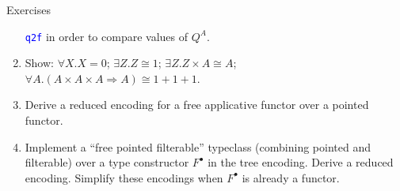 \documentclass[english,,russian]{beamer}
\begin{document}
\begin{frame}{Exercises}
\begin{enumerate}
{}\texttt{\textcolor{blue}{\footnotesize{}q2f}}{\footnotesize{} in
order to compare values of $Q^{A}$.}{\footnotesize\par}
\item {\footnotesize{}Show: $\forall X.X=0$; $\exists Z.Z\cong1$; $\exists Z.Z\times A\cong A$;
$\forall A.\left(A\times A\times A\Rightarrow A\right)\cong1+1+1$.}{\footnotesize\par}
\item {\footnotesize{}Derive a reduced encoding for a free applicative functor
over a pointed functor.}{\footnotesize\par}
\item {\footnotesize{}Implement a ``free pointed filterable'' typeclass
(combining pointed and filterable) over a type constructor $F^{\bullet}$
in the tree encoding. Derive a reduced encoding. Simplify these encodings
when $F^{\bullet}$ is already a functor.}{\footnotesize\par}
\end{enumerate}
\end{frame}
\end{document}
